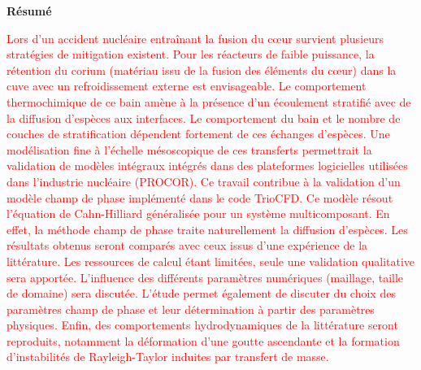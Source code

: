 \documentclass[a4paper,11pt]{report}    %
\begin{document}
\begin{titlepage}
\begin{center}
    \end{center}
\end{titlepage}




\thispagestyle{empty}
\begin{center}
    \Large
    \vspace{0.9cm}
    \textbf{Résumé} 
\end{center}

\textcolor{red}{
Lors d'un accident nucléaire entraînant la fusion du c\oe ur survient plusieurs stratégies de mitigation existent. Pour les réacteurs de faible puissance, la rétention du corium (matériau issu de la fusion des éléments du c\oe ur) dans la cuve avec un refroidissement externe est envisageable. Le comportement thermochimique de ce bain amène à la présence d'un écoulement stratifié avec de la diffusion d'espèces aux interfaces. Le comportement du bain et le nombre de couches de stratification dépendent fortement de ces échanges d'espèces. Une modélisation fine à l'échelle mésoscopique de ces transferts permettrait la validation de modèles intégraux intégrés dans des plateformes logicielles utilisées dans l'industrie nucléaire (PROCOR). Ce travail contribue à la validation d'un modèle champ de phase implémenté dans le code TrioCFD. Ce modèle résout l'équation de Cahn-Hilliard généralisée pour un système multicomposant. En effet, la méthode champ de phase traite naturellement la diffusion d'espèces. Les résultats obtenus seront comparés avec ceux issus d'une expérience de la littérature. Les ressources de calcul étant limitées, seule une validation qualitative sera apportée. L'influence des différents paramètres numériques (maillage, taille de domaine) sera discutée. L'étude permet également de discuter du choix des paramètres champ de phase et leur détermination à partir des paramètres physiques. Enfin, des comportements hydrodynamiques de la littérature seront reproduits, notamment la déformation d'une goutte ascendante et la formation d'instabilités de Rayleigh-Taylor induites par transfert de masse.
}
\end{document}
